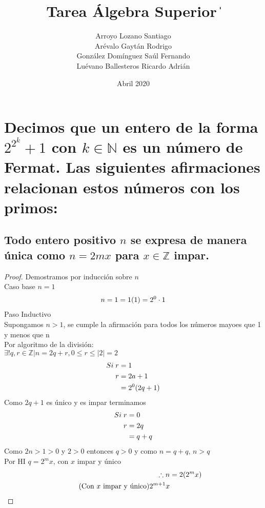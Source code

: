 \documentclass[14pt]{extarticle}
\title{Tarea Álgebra Superior \|}
\author{Arroyo Lozano Santiago \\ Arévalo Gaytán Rodrigo \\  González Domínguez Saúl Fernando \\ Luévano Ballesteros Ricardo Adrián}
\date{Abril 2020}
\newcommand{\mysection}[2]{\setcounter{section}{#1}\addtocounter{section}{-1}\section{#2}}
\begin{document}
\maketitle

\mysection{6}{Decimos que un entero de la forma $2^2^k + 1$ con $k \in \mathbb{N}$ es un número de Fermat. Las siguientes afirmaciones relacionan estos números con los primos:}
    \subsection{Todo entero positivo $n$ se expresa de manera única como $n = 2mx$ para $x \in \mathbb{Z}$ impar.}
        \begin{proof}
            Demostramos por inducción sobre $n$ \\
            Caso base $n = 1$\\
            \begin{align}
                \notag n = 1 = 1(1) = 2^0 \cdot 1
            \end{align}
            Paso Inductivo \\
            Supongamos $n > 1$, se cumple la afirmación para todos los números mayoes que 1 y menos que n \\
            Por algoritmo de la división: \\
            $\exists ! q,r \in \mathbb{Z} | n = 2q+r, 0 \leq r \leq |2| = 2$
            \begin{align}
                \notag Si \; r &= 1\\
                \notag r &= 2a+1 \\
                \notag &= 2^0(2q+1)
            \end{align}
            Como $2q+1$ es único y es impar terminamos
             \begin{align}
                \notag Si \; r &= 0\\
                \notag r &= 2q\\
                \notag &= q+q
            \end{align}
            Como $2n > 1 > 0$ y $2 > 0$ entonces $q > 0$ y como $n = q+q$, $n > q$ \\
            Por HI $q=2^mx$, con $x$ impar y único \\
            \begin{align}
                \notag \therefore n &= 2(2^mx) \\
                \tag{Con $x$ impar y único} 2^{m+1}x
            \end{align}

\end{proof}
\end{document}
